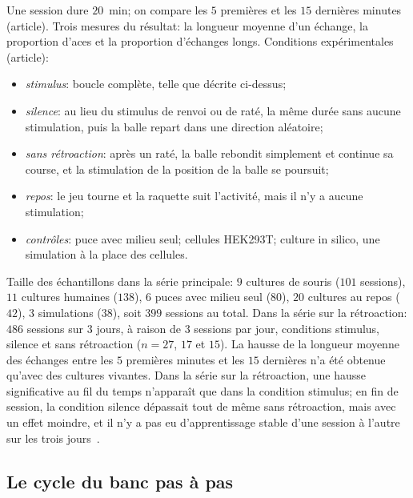 Une session dure $20$~min; on compare les $5$ premières et les $15$ dernières minutes (article). Trois mesures du résultat: la longueur moyenne d'un échange, la proportion d'aces et la proportion d'échanges longs. Conditions expérimentales (article):
\begin{itemize}
\item \emph{stimulus}: boucle complète, telle que décrite ci-dessus;
\item \emph{silence}: au lieu du stimulus de renvoi ou de raté, la même durée sans aucune stimulation, puis la balle repart dans une direction aléatoire;
\item \emph{sans rétroaction}: après un raté, la balle rebondit simplement et continue sa course, et la stimulation de la position de la balle se poursuit;
\item \emph{repos}: le jeu tourne et la raquette suit l'activité, mais il n'y a aucune stimulation;
\item \emph{contrôles}: puce avec milieu seul; cellules HEK293T; \og culture in silico\fg{}, une simulation à la place des cellules.
\end{itemize}
Taille des échantillons dans la série principale: $9$ cultures de souris ($101$ sessions), $11$ cultures humaines ($138$), $6$ puces avec milieu seul ($80$), $20$ cultures au repos ($42$), $3$ simulations ($38$), soit $399$ sessions au total. Dans la série sur la rétroaction: $486$ sessions sur $3$ jours, à raison de $3$ sessions par jour, conditions \og stimulus\fg{}, \og silence\fg{} et \og sans rétroaction\fg{} ($n=27$, $17$ et $15$). La hausse de la longueur moyenne des échanges entre les $5$ premières minutes et les $15$ dernières n'a été obtenue qu'avec des cultures vivantes. Dans la série sur la rétroaction, une hausse significative au fil du temps n'apparaît que dans la condition \og stimulus\fg{}; en fin de session, la condition \og silence\fg{} dépassait tout de même \og sans rétroaction\fg{}, mais avec un effet moindre, et il n'y a pas eu d'apprentissage stable d'une session à l'autre sur les trois jours~\cite{Kagan2022}.

\subsection*{Le cycle du banc pas à pas}

